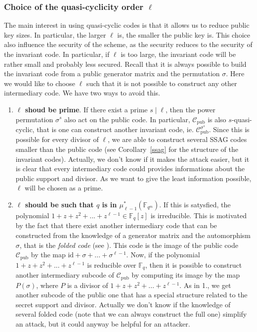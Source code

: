 \documentclass[10pt]{article}
\theoremstyle{definition}
\theoremstyle{definition}
\theoremstyle{definition}
\newcommand{\s}{\vspace{0.3cm}}
\newcommand{\C}{\mathcal{C}}
\newcommand{\fqm}{\mathbb{F}_{q^m}}
\newcommand{\fq}{\mathbb{F}_q}
\begin{document}
\s

\subsubsection{Choice of the quasi-cyclicity order $\ell$}

\s

The main interest in using quasi-cyclic codes is that it allows us to reduce public key sizes. In particular, the larger $\ell$ is, the smaller the public key is. This choice also influence the security of the scheme, as the security reduces to the security of the invariant code. In particular, if $\ell$ is too large, the invariant code will be rather small and probably less secured. Recall that it is always possible to build the invariant code from a public generator matrix and the permutation $\sigma$. Here we would like to choose $\ell$ such that it is not possible to construct any other intermediary code. We have two ways to avoid this.

\s

\begin{enumerate}
\item \textbf{$\ell$ shoud be prime}. If there exist a prime $s \mid \ell$, then the power permutation $\sigma^s$ also act on the public code. In particular, $\C_{\textrm{pub}}$ is also $s$-quasi-cyclic, that is one can construct another invariant code, ie. $\C_{\textrm{pub}}^{\sigma^s}$. Since this is possible for every divisor of $\ell$, we are able to construct several SSAG codes smaller than the public code (see Corollary~\ref{ssag} for the structure of the invariant codes). Actually, we don't know if it makes the attack easier, but it is clear that every intermediary code could provides informations about the public support and divisor. As we want to give the least information possible, $\ell$ will be chosen as a prime.

\item \textbf{$\ell$ should be such that $q$ is in $\mu_{\ell -1}^*(\fqm)$}. If this is satysfied, the polynomial $1+z+z^2+...+z^{\ell-1} \in \fq[z]$ is irreducible. This is motivated by the fact that there exist another intermediary code that can be constructed from the knowledge of a generator matrix and the automorphism $\sigma$, that is the \textit{folded code} (see \cite{FOP}). This code is the image of the public code $\C_{\textrm{pub}}$ by the map $\mathrm{id} +\sigma+...+\sigma^{\ell-1}$. Now, if the polynomial $1+z+z^2+...+z^{\ell-1}$ is reducible over $\fq$, then it is possible to construct another intermediary subcode of $\C_{\mathrm{pub}}$ by computing its image by the map $P(\sigma)$, where $P$ is a divisor of $1+z+z^2+...+z^{\ell-1}$. As in 1., we get another subcode of the public one that has a special structure related to the secret support and divisor. Actually we don't know if the knowledge of several folded code (note that we can always construct the full one) simplify an attack, but it could anyway be helpful for an attacker.
\end{enumerate}
\end{document}
